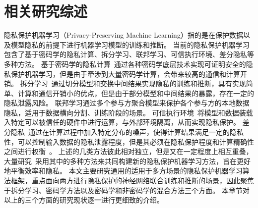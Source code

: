 \chapter{相关研究综述}
隐私保护机器学习（Privacy-Preserving Machine Learning）指的是在保护数据以及模型隐私的前提下进行机器学习模型的训练和推断。
%
当前的隐私保护机器学习包含了基于密码学的隐私计算、拆分学习、联邦学习、可信执行环境、差分隐私等多种方法。
%
基于密码学的隐私计算~\cite{al_2019_ppml}通过各种密码学底层技术实现可证明安全的隐私保护机器学习，但是由于牵涉到大量密码学计算，会带来较高的通信和计算开销。
%
拆分学习~\cite{vepakomma2018split}通过切分模型和交换中间结果实现隐私的训练和推断，具有实现简单、计算和通信开销小的优点，但是由于部分模型和中间结果的暴露，存在一定的隐私泄露风险。
%
联邦学习\cite{yangqiang2019federated,mcmahan_2017_fedavg}通过多个参与方聚合模型来保护各个参与方的本地数据隐私，适用于数据横向分割、训练阶段的场景。
%
可信执行环境~\cite{sabt_2015_tee,2016_intel_sgx}将模型和数据装载入特定可以被信任的硬件中进行运算，与外部环境隔离，从而实现隐私保护。
%
差分隐私~\cite{dwork_2006_differential_privacy,wuruihan_2023_label_dp}通过在计算过程中加入特定分布的噪声，使得计算结果满足一定的隐私性，可以控制输入数据的隐私泄露程度，但是其必须在隐私保护程度和计算精确性之间进行权衡~\cite{abadi_2016_dp_dl}。
%
上述的几类方法彼此相对独立，但是又在一定程度上相互重叠，大量研究~\cite{zhangqiao_2018_gelu_net,bonawitz_2017_secure_agg,thapa_2022_splitfed,zhou_2022_codesign,riazi_2018_chameleon,weikang_2020_fed_dp}采用其中的多种方法来共同构建新的隐私保护机器学习方法，旨在更好地平衡效率和隐私。
%
本文主要研究通用的适用于多方场景的隐私保护机器学习算法框架，重点面向两方进行隐私保护的神经网络联合训练和推断的场景，因此聚焦于拆分学习、密码学方法以及密码学和非密码学的混合方法三个方面。
%
本章节对以上的三个方面的研究现状逐一进行更细致的介绍。



